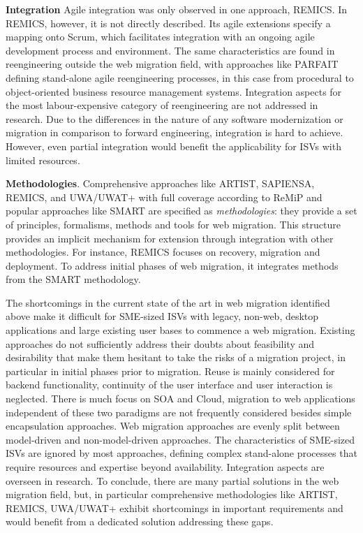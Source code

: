 \textbf{Integration} Agile integration was only observed in one approach, REMICS.
In REMICS, however, it is not directly described.
Its agile extensions specify a mapping onto Scrum, which facilitates integration with an ongoing agile development process and environment.
The same characteristics are found in reengineering outside the web migration field, with approaches like PARFAIT \autocite{Cagnin2003} defining stand-alone agile reengineering processes, in this case from procedural to object-oriented business resource management systems.
Integration aspects for the most labour-expensive category of reengineering are not addressed in research.
Due to the differences in the nature of any software modernization or migration in comparison to forward engineering, integration is hard to achieve.
However, even partial integration would benefit the applicability for ISVs with limited resources.

\textbf{Methodologies}.
Comprehensive approaches like ARTIST, SAPIENSA, REMICS, and UWA/UWAT+ with full coverage according to ReMiP and popular approaches like SMART are specified as \emph{methodologies}: they provide a set of principles, formalisms, methods and tools \autocite{Wallmueller2001SoftwareQuality} for web migration.
This structure provides an implicit mechanism for extension through integration with other methodologies.
For instance, REMICS focuses on recovery, migration and deployment.
To address initial phases of web migration, it integrates methods from the SMART methodology.

The shortcomings in the current state of the art in web migration identified above make it difficult for SME-sized ISVs with legacy, non-web, desktop applications and large existing user bases to commence a web migration.
Existing approaches do not sufficiently address their doubts about feasibility and desirability that make them hesitant to take the risks of a migration project, in particular in initial phases prior to migration.
Reuse is mainly considered for backend functionality, continuity of the user interface and user interaction is neglected.
There is much focus on SOA and Cloud, migration to web applications independent of these two paradigms are not frequently considered besides simple encapsulation approaches.
Web migration approaches are evenly split between model-driven and non-model-driven approaches.
The characteristics of SME-sized ISVs are ignored by most approaches, defining complex stand-alone processes that require resources and expertise beyond availability.
Integration aspects are overseen in research.
To conclude, there are many partial solutions in the web migration field, but, in particular comprehensive methodologies like ARTIST, REMICS, UWA/UWAT+ exhibit shortcomings in important requirements and would benefit from a dedicated solution addressing these gaps.

